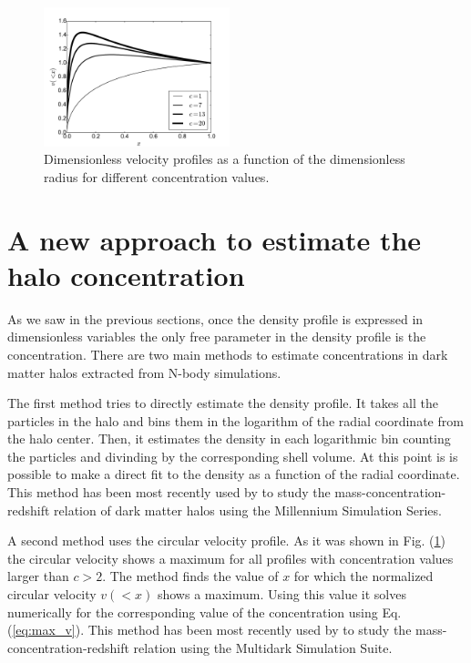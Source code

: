 \documentclass[useAMS,usenatbib]{mn2e}
\begin{document}
\begin{figure}
\begin{center}
  \includegraphics[width=0.48\textwidth]{vel_normalized.pdf}
\end{center}
\caption{Dimensionless velocity profiles as a function of the
  dimensionless radius for different concentration values.
    \label{fig:velocity}}
\end{figure}

\section{A new approach to estimate the halo concentration}
\label{sec:method}

As we saw in the previous sections, once the density profile is
expressed in dimensionless variables the only free parameter in the
density profile  is the concentration. There are two main methods to
estimate concentrations in dark matter halos extracted from N-body
simulations. 

The first method tries to directly estimate the density profile. 
It takes all the particles in the halo and bins them in the logarithm
of the radial coordinate from the halo center.
Then, it estimates the density in each logarithmic bin counting the
particles and divinding by the corresponding shell volume.
At this point is is possible to make a direct fit to the density as a
function of the radial coordinate. 
This method has been most recently used by \cite{Ludlow2014} to study
the mass-concentration-redshift relation of dark matter halos using
the Millennium Simulation Series. 

A second method uses the circular velocity profile.
As it was shown in Fig. (\ref{fig:velocity}) the circular velocity
shows a maximum for all profiles with concentration values larger than
$c>2$.
The method finds the value of $x$ for which the normalized circular
velocity $v(<x)$ shows a maximum. 
Using this value it solves numerically for the corresponding value of
the concentration using Eq. (\ref{eq:max_v}).  
This method has been most recently used by \cite{Klypin2014} to study
the mass-concentration-redshift relation using the Multidark
Simulation Suite. 
\end{document}
